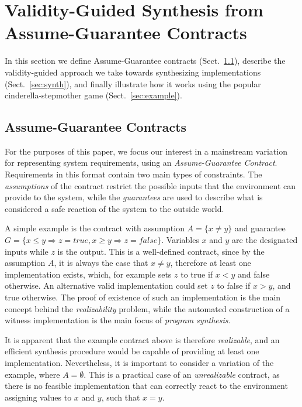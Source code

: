 \section{Validity-Guided Synthesis from Assume-Guarantee Contracts}
\label{sec:synthesis}


In this section we define Assume-Guarantee contracts (Sect.~\ref{sec:pre}),
describe the validity-guided approach we take towards synthesizing
implementations (Sect.~\ref{sec:synth}),
and finally illustrate how it works using the popular cinderella-stepmother
game (Sect.~\ref{sec:example}).

\subsection{Assume-Guarantee Contracts}
\label{sec:pre}

For the purposes of this paper, we focus our interest in a mainstream variation
for representing system requirements, using an \textit{Assume-Guarantee
Contract}. Requirements in this format contain two main types of constraints.
The \emph{assumptions} of the contract restrict the possible inputs that the
environment can provide to the system, while the \emph{guarantees} are used to
describe what is considered a safe reaction of the system to the outside world.

A simple example is the contract with assumption $A = \{x\neq
y\}$ and guarantee $G = \{x \leq y \Rightarrow z =
\textit{true}, x \geq y \Rightarrow z = \textit{false}\}$. Variables
$x$ and $y$ are the designated inputs while $z$ is the output. This is a
well-defined contract, since by the assumption $A$, it is always the case that
$x \neq y$, therefore at least one implementation exists, which, for example
sets $z$ to true if $x < y$ and false otherwise. An alternative
valid implementation could set $z$ to false if $x > y$, and true otherwise. The
proof of existence of such an implementation is the main concept behind the
\emph{realizability} problem, while the automated construction of a witness
implementation is the main focus of \emph{program synthesis}.


It is apparent that the example contract above is therefore \emph{realizable},
and an efficient synthesis procedure would be capable of providing at least one
implementation. Nevertheless, it is important to consider a variation of the
example, where $A = \emptyset$. This is a practical case of an
\emph{unrealizable} contract, as there is no feasible implementation that can
correctly react to the environment assigning values to $x$ and $y$, such that
$x = y$.

